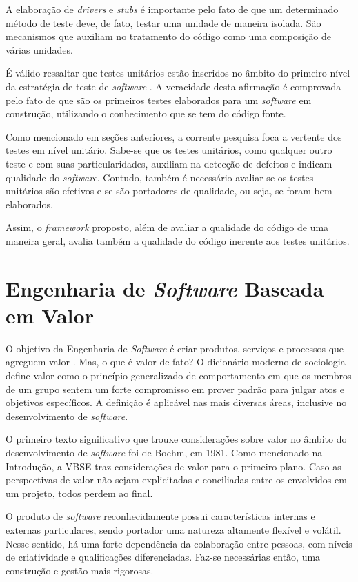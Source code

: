 A elaboração de \textit{drivers} e \textit{stubs} é importante pelo fato de que um determinado método de teste deve, de fato, testar uma unidade de maneira isolada. São mecanismos que auxiliam no tratamento do código como uma composição de várias unidades.

É válido ressaltar que testes unitários estão inseridos no âmbito do primeiro nível da estratégia de teste de \textit{software} \cite{nasa}. A veracidade desta afirmação é comprovada pelo fato de que são os primeiros testes elaborados para um \textit{software} em construção, utilizando o conhecimento que se tem do código fonte.

Como mencionado em seções anteriores, a corrente pesquisa foca a vertente dos testes em nível unitário. Sabe-se que os testes unitários, como qualquer outro teste e com suas particularidades, auxiliam na detecção de defeitos e indicam qualidade do \textit{software}. Contudo, também é necessário avaliar se os testes unitários são efetivos e se são portadores de qualidade, ou seja, se foram bem elaborados.

Assim, o \textit{framework} proposto, além de avaliar a qualidade do código de uma maneira geral, avalia também a qualidade do código inerente aos testes unitários.

\section {Engenharia de \textit{Software} Baseada em Valor}

O objetivo da Engenharia de \textit{Software} é criar produtos, serviços e processos que agreguem valor \cite{vbse1}. Mas, o que é valor de fato? O dicionário moderno de sociologia define valor como o princípio generalizado de comportamento em que os membros de um grupo sentem um forte compromisso em prover padrão para julgar atos e objetivos específicos. A definição é aplicável nas mais diversas áreas, inclusive no desenvolvimento de \textit{software}.

O primeiro texto significativo que trouxe considerações sobre valor no âmbito do desenvolvimento de \textit{software} foi de Boehm, em 1981. Como mencionado na Introdução, a VBSE traz considerações de valor para o primeiro plano. Caso as perspectivas de valor não sejam explicitadas e conciliadas entre os envolvidos em um projeto, todos perdem ao final.

O produto de \textit{software} reconhecidamente possui características internas e externas particulares, sendo portador uma natureza altamente flexível e volátil. Nesse sentido, há uma forte dependência da colaboração entre pessoas, com níveis de criatividade e qualificações diferenciadas. Faz-se necessárias então, uma construção e gestão mais rigorosas.

